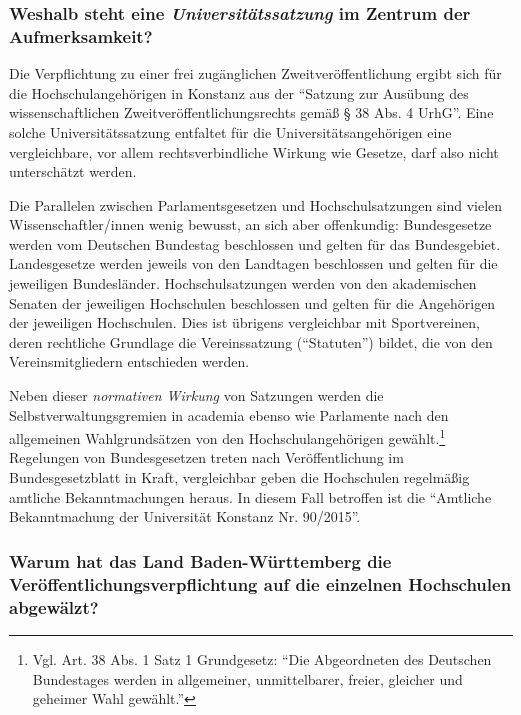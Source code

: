 \documentclass[a4paper,
fontsize=11pt,
oneside,
numbers=noperiodatend,
parskip=half-,
bibliography=totoc,
final
]{scrartcl}
\begin{document}
\hypertarget{weshalb-steht-eine-universituxe4tssatzung-im-zentrum-der-aufmerksamkeit}{%
\subsubsection{\texorpdfstring{Weshalb steht eine
\emph{Universitätssatzung} im Zentrum der
Aufmerksamkeit?}{Weshalb steht eine Universitätssatzung im Zentrum der Aufmerksamkeit?}}\label{weshalb-steht-eine-universituxe4tssatzung-im-zentrum-der-aufmerksamkeit}}

Die Verpflichtung zu einer frei zugänglichen Zweitveröffentlichung
ergibt sich für die Hochschulangehörigen in Konstanz aus der
\enquote{Satzung zur Ausübung des wissenschaftlichen
Zweit\-ver\-öffent\-lich\-ungs\-rechts gemäß § 38 Abs. 4 UrhG}. Eine solche
Universitätssatzung entfaltet für die Universitätsangehörigen eine
vergleichbare, vor allem rechtsverbindliche Wirkung wie Gesetze, darf
also nicht unterschätzt werden.

Die Parallelen zwischen Parlamentsgesetzen und Hochschulsatzungen sind
vielen Wissenschaftler/innen wenig bewusst, an sich aber offenkundig:
Bundesgesetze werden vom Deutschen Bundestag beschlossen und gelten für
das Bundesgebiet. Landesgesetze werden jeweils von den Landtagen
beschlossen und gelten für die jeweiligen Bundesländer.
Hochschulsatzungen werden von den akademischen Senaten der jeweiligen
Hochschulen beschlossen und gelten für die Angehörigen der jeweiligen
Hochschulen. Dies ist übrigens vergleichbar mit Sportvereinen, deren
rechtliche Grundlage die Vereinssatzung (\enquote{Statuten}) bildet, die
von den Vereinsmitgliedern entschieden werden.

Neben dieser \emph{normativen Wirkung} von Satzungen werden die
Selbstverwaltungsgremien in academia ebenso wie Parlamente nach den
allgemeinen Wahlgrundsätzen von den Hochschulangehörigen
gewählt.\footnote{Vgl. Art. 38 Abs. 1 Satz 1 Grundgesetz: \enquote{Die
  Abgeordneten des Deutschen Bundestages werden in allgemeiner,
  unmittelbarer, freier, gleicher und geheimer Wahl gewählt.}}
Regelungen von Bundesgesetzen treten nach Veröffentlichung im
Bundesgesetzblatt in Kraft, vergleichbar geben die Hochschulen
regelmäßig amtliche Bekanntmachungen heraus. In diesem Fall betroffen
ist die \enquote{Amtliche Bekanntmachung der Universität Konstanz Nr.
90/2015}.

\hypertarget{warum-hat-das-land-baden-wuxfcrttemberg-die-veruxf6ffentlichungsverpflichtung-auf-die-einzelnen-hochschulen-abgewuxe4lzt}{%
\subsubsection{Warum hat das Land Baden-Württemberg die
Veröffentlichungsverpflichtung auf die einzelnen Hochschulen
abgewälzt?}\label{warum-hat-das-land-baden-wuxfcrttemberg-die-veruxf6ffentlichungsverpflichtung-auf-die-einzelnen-hochschulen-abgewuxe4lzt}}
\end{document}
